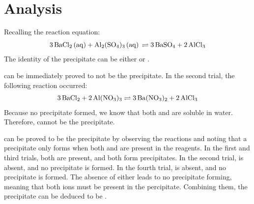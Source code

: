 
\section{Analysis} \label{sec:analysis}
Recalling the reaction equation:
$$\rxnpl$$
The identity of the precipitate can be either  or .

 can be immediately proved to not be the precipitate. In the second trial, the following reaction occurred:
$$\ce{3BaCl2} + \ce{2Al(NO3)3} \rightleftharpoons \ce{3Ba(NO3)2} + \ce{2AlCl3}$$
Because no precipitate formed, we know that both  and  are soluble in water. Therefore,  cannot be the precipitate.

 can be proved to be the precipitate by observing the reactions and noting that a precipitate only forms when both  and  are present in the reagents.
In the first and third trials, both are present, and both form precipitates. In the second trial,  is absent, and no precipitate is formed. In the fourth trial,  is absent, and no precipitate is formed. The absence of either leads to no precipitate forming, meaning that both ions must be present in the percipitate. Combining them, the precipitate can be deduced to be .